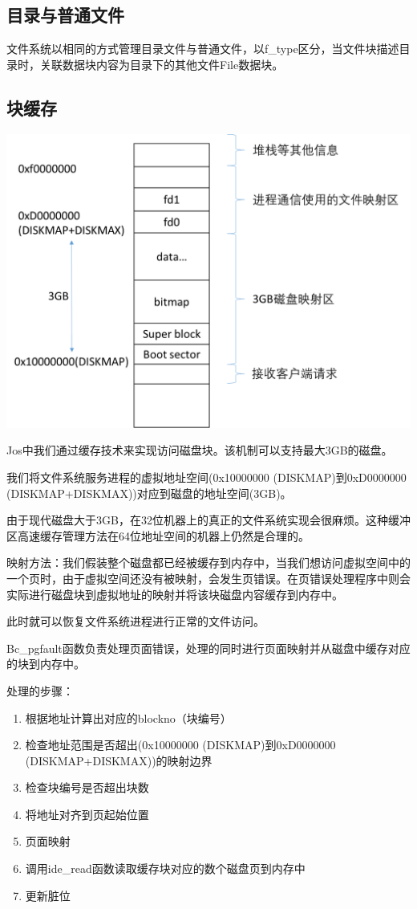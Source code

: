 \subsection{目录与普通文件}

文件系统以相同的方式管理目录文件与普通文件，以f\_type区分，当文件块描述目录时，关联数据块内容为目录下的其他文件File数据块。

\subsection{块缓存}

\includegraphics[width=6in]{figures/file/image111.png}

Jos中我们通过缓存技术来实现访问磁盘块。该机制可以支持最大3GB的磁盘。

我们将文件系统服务进程的虚拟地址空间(0x10000000 (DISKMAP)到0xD0000000 (DISKMAP+DISKMAX))对应到磁盘的地址空间(3GB)。

由于现代磁盘大于3GB，在32位机器上的真正的文件系统实现会很麻烦。这种缓冲区高速缓存管理方法在64位地址空间的机器上仍然是合理的。

映射方法：我们假装整个磁盘都已经被缓存到内存中，当我们想访问虚拟空间中的一个页时，由于虚拟空间还没有被映射，会发生页错误。在页错误处理程序中则会实际进行磁盘块到虚拟地址的映射并将该块磁盘内容缓存到内存中。

此时就可以恢复文件系统进程进行正常的文件访问。

Bc\_pgfault函数负责处理页面错误，处理的同时进行页面映射并从磁盘中缓存对应的块到内存中。

处理的步骤：

\begin{enumerate}
\item 根据地址计算出对应的blockno（块编号）
\item 检查地址范围是否超出(0x10000000 (DISKMAP)到0xD0000000 (DISKMAP+DISKMAX))的映射边界
\item 检查块编号是否超出块数
\item 将地址对齐到页起始位置
\item 页面映射
\item 调用ide\_read函数读取缓存块对应的数个磁盘页到内存中
\item 更新脏位
\end{enumerate}

